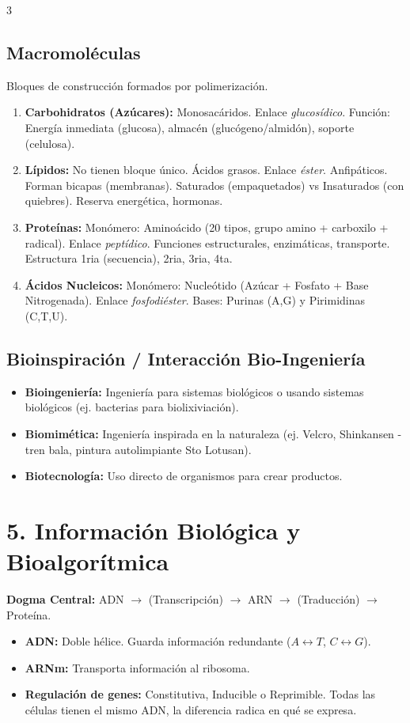 \documentclass[9pt,letterpaper]{extarticle}
\begin{document}
\begin{multicols*}{3}
	\subsection*{Macromoléculas}
	Bloques de construcción formados por polimerización.
	\begin{enumerate}
		\item \textbf{Carbohidratos (Azúcares):} Monosacáridos. Enlace \textit{glucosídico}. Función: Energía inmediata (glucosa), almacén (glucógeno/almidón), soporte (celulosa).
		\item \textbf{Lípidos:} No tienen bloque único. Ácidos grasos. Enlace \textit{éster}. Anfipáticos. Forman bicapas (membranas). Saturados (empaquetados) vs Insaturados (con quiebres). Reserva energética, hormonas.
		\item \textbf{Proteínas:} Monómero: Aminoácido (20 tipos, grupo amino + carboxilo + radical). Enlace \textit{peptídico}. Funciones estructurales, enzimáticas, transporte. Estructura 1ria (secuencia), 2ria, 3ria, 4ta.
		\item \textbf{Ácidos Nucleicos:} Monómero: Nucleótido (Azúcar + Fosfato + Base Nitrogenada). Enlace \textit{fosfodiéster}. Bases: Purinas (A,G) y Pirimidinas (C,T,U).
	\end{enumerate}

	\subsection*{Bioinspiración / Interacción Bio-Ingeniería}
	\begin{itemize}
		\item \textbf{Bioingeniería:} Ingeniería para sistemas biológicos o usando sistemas biológicos (ej. bacterias para biolixiviación).
		\item \textbf{Biomimética:} Ingeniería inspirada en la naturaleza (ej. Velcro, Shinkansen - tren bala, pintura autolimpiante Sto Lotusan).
		\item \textbf{Biotecnología:} Uso directo de organismos para crear productos.
	\end{itemize}

	\section*{5. Información Biológica y Bioalgorítmica}
	\textbf{Dogma Central:} ADN $\rightarrow$ (Transcripción) $\rightarrow$ ARN $\rightarrow$ (Traducción) $\rightarrow$ Proteína.
	\begin{itemize}
		\item \textbf{ADN:} Doble hélice. Guarda información redundante ($A\leftrightarrow T$, $C\leftrightarrow G$).
		\item \textbf{ARNm:} Transporta información al ribosoma.
		\item \textbf{Regulación de genes:} Constitutiva, Inducible o Reprimible. Todas las células tienen el mismo ADN, la diferencia radica en qué se expresa.
	\end{itemize}


\end{multicols*}
\end{document}
